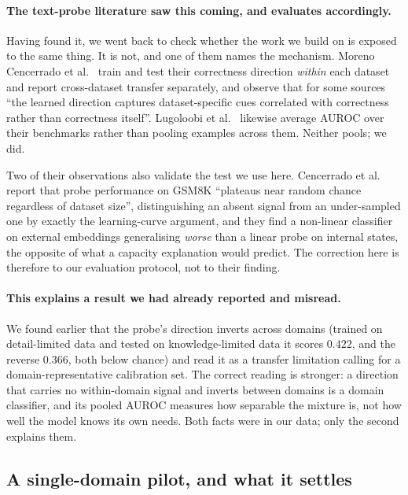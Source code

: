 \documentclass[10pt,twocolumn]{article}
\theoremstyle{plain}
\begin{document}
\paragraph{The text-probe literature saw this coming, and evaluates
accordingly.} Having found it, we went back to check whether the work we build
on is exposed to the same thing. It is not, and one of them names the mechanism.
Moreno Cencerrado et al.~\cite{cencerrado} train and test their correctness
direction \emph{within} each dataset and report cross-dataset transfer
separately, and observe that for some sources ``the learned direction captures
dataset-specific cues correlated with correctness rather than correctness
itself''. Lugoloobi et al.~\cite{lugoloobi} likewise average AUROC over their
benchmarks rather than pooling examples across them. Neither pools; we did.

Two of their observations also validate the test we use here. Cencerrado et al.
report that probe performance on GSM8K ``plateaus near random chance regardless
of dataset size'', distinguishing an absent signal from an under-sampled one by
exactly the learning-curve argument, and they find a non-linear classifier on
external embeddings generalising \emph{worse} than a linear probe on internal
states, the opposite of what a capacity explanation would predict. The
correction here is therefore to our evaluation protocol, not to their finding.

\paragraph{This explains a result we had already reported and misread.} We
found earlier that the probe's direction inverts across domains (trained on detail-limited data and tested on knowledge-limited data it scores $0.422$, and the reverse $0.366$, both below chance) and read it as a transfer limitation
calling for a domain-representative calibration set. The correct reading is
stronger: a direction that carries no within-domain signal and inverts between
domains is a domain classifier, and its pooled AUROC measures how separable the
mixture is, not how well the model knows its own needs. Both facts were in our
data; only the second explains them.

\subsection{A single-domain pilot, and what it settles}
\label{sec:singledomain}
\end{document}
